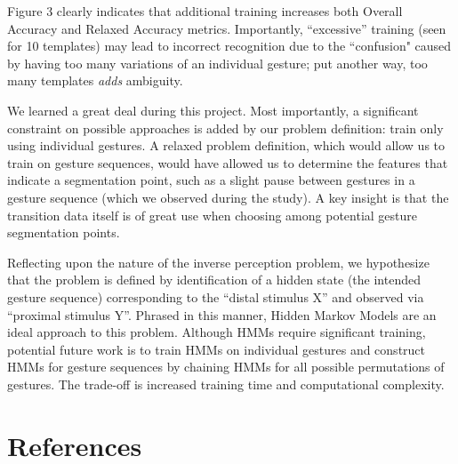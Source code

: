 \documentclass[twoside]{article}
\begin{document}
\begin{multicols}{2}
Figure 3 clearly indicates that additional training increases both Overall
Accuracy and Relaxed Accuracy metrics. Importantly, ``excessive'' training (seen
for 10 templates) may lead to incorrect recognition due to the ``confusion"
caused by having too many variations of an individual gesture; put another way,
too many templates \emph{adds} ambiguity.

We learned a great deal during this project. Most importantly, a significant
constraint on possible approaches is added by our problem definition: train only
using individual gestures. A relaxed problem definition, which would allow us to
train on gesture sequences, would have allowed us to determine the features that
indicate a segmentation point, such as a slight pause between gestures in a
gesture sequence (which we observed during the study). A key insight is that the
transition data itself is of great use when choosing among potential gesture
segmentation points.

Reflecting upon the nature of the inverse perception problem, we hypothesize
that the problem is defined by identification of a hidden state (the intended
gesture sequence) corresponding to the ``distal stimulus X'' and observed via
``proximal stimulus Y''. Phrased in this manner, Hidden Markov Models are an
ideal approach to this problem. Although HMMs require significant training,
potential future work is to train HMMs on individual gestures and construct HMMs
for gesture sequences by chaining HMMs for all possible permutations of
gestures. The trade-off is increased training time and computational complexity.
\section{References}

\begin{spacing}{0.9}
	
%
\begingroup
\renewcommand{\section}[2]{}%

\endgroup
\end{spacing}

\end{multicols}
\end{document}
